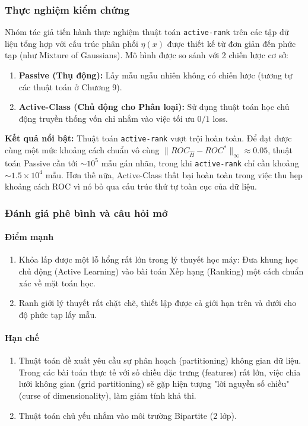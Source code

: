 \subsubsection{Thực nghiệm kiểm chứng}
Nhóm tác giả tiến hành thực nghiệm thuật toán \texttt{active-rank} trên các tập dữ liệu tổng hợp với cấu trúc phân phối $\eta(x)$ được thiết kế từ đơn giản đến phức tạp (như Mixture of Gaussians).
Mô hình được so sánh với 2 chiến lược cơ sở:
\begin{enumerate}
  \item \textbf{Passive (Thụ động):} Lấy mẫu ngẫu nhiên không có chiến lược (tương tự các thuật toán ở Chương 9).
  \item \textbf{Active-Class (Chủ động cho Phân loại):} Sử dụng thuật toán học chủ động truyền thống vốn chỉ nhắm vào việc tối ưu $0/1$ loss.
\end{enumerate}

\textbf{Kết quả nổi bật:}
Thuật toán \texttt{active-rank} vượt trội hoàn toàn. Để đạt được cùng một mức khoảng cách chuẩn vô cùng $\| ROC_{\hat{H}} - ROC^* \|_{\infty} \approx 0.05$, thuật toán Passive cần tới $\sim 10^5$ mẫu gán nhãn, trong khi \texttt{active-rank} chỉ cần khoảng $\sim 1.5 \times 10^4$ mẫu. Hơn thế nữa, Active-Class thất bại hoàn toàn trong việc thu hẹp khoảng cách ROC vì nó bỏ qua cấu trúc thứ tự toàn cục của dữ liệu.

\subsubsection{Đánh giá phê bình và câu hỏi mở}
\paragraph{Điểm mạnh}
\begin{enumerate}
  \item Khỏa lấp được một lỗ hổng rất lớn trong lý thuyết học máy: Đưa khung học chủ động (Active Learning) vào bài toán Xếp hạng (Ranking) một cách chuẩn xác về mặt toán học.
  \item Ranh giới lý thuyết rất chặt chẽ, thiết lập được cả giới hạn trên và dưới cho độ phức tạp lấy mẫu.
\end{enumerate}

\paragraph{Hạn chế}
\begin{enumerate}
  \item Thuật toán đề xuất yêu cầu sự phân hoạch (partitioning) không gian dữ liệu. Trong các bài toán thực tế với số chiều đặc trưng (features) rất lớn, việc chia lưới không gian (grid partitioning) sẽ gặp hiện tượng "lời nguyền số chiều" (curse of dimensionality), làm giảm tính khả thi.
  \item Thuật toán chủ yếu nhắm vào môi trường Bipartite (2 lớp).
\end{enumerate}


